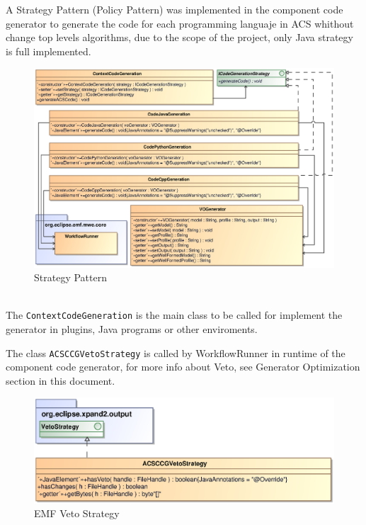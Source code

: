 A Strategy Pattern (Policy Pattern) was implemented in the component code
generator to generate the code for each programming languaje in ACS whithout
change top levels algorithms, due to the scope of the project, only Java
strategy is full implemented. 
\begin{figure}[h!t]
\begin{center}
\includegraphics[scale=0.85]{images/strategypattern}
\caption{\label{fig:sp_diag}Strategy Pattern}
\end{center}
\end{figure}
\\The {\tt ContextCodeGeneration} is the main class to be called for implement
the generator in plugins, Java programs or other enviroments.

\newpage

The class {\tt ACSCCGVetoStrategy} is called by WorkflowRunner in runtime of
the component code generator, for more info about Veto, see Generator
Optimization section in this document. 
\begin{figure}[h!t]
\begin{center}
\includegraphics[scale=0.65]{images/vetostrategy}
\caption{\label{fig:vs_diag}EMF Veto Strategy}
\end{center}
\end{figure}

